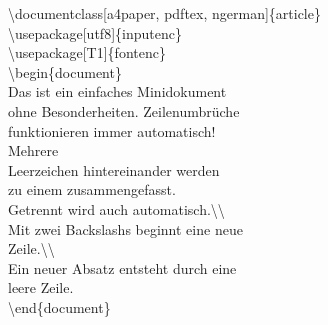 \color{nounibaredI}\color{nounibaredI}\textbackslash documentclass\color{black}\color{nounibagreenI}[a4paper, pdftex, ngerman]\color{black}\{article\} \\
\color{nounibaredI}\color{nounibaredI}\textbackslash usepackage\color{black}\color{nounibagreenI}[utf8]\color{black}\{inputenc\} \\
\color{nounibaredI}\color{nounibaredI}\textbackslash usepackage\color{black}\color{nounibagreenI}[T1]\color{black}\{fontenc\} \\
\color{nounibaredI}\color{unibablueI}\textbackslash\color{unibablueI}begin\color{black}\color{black}\{document\} \\
Das ist ein einfaches Minidokument \\
ohne Besonderheiten. Zeilenumbrüche \\
funktionieren immer automatisch! \\
Mehrere \\
Leerzeichen hintereinander werden  \\
zu einem zusammengefasst. \\
Getrennt wird auch automatisch.\color{nounibaredI}\color{nounibaredI}\textbackslash \color{nounibaredI}\textbackslash \color{black} \\
Mit zwei Backslashs beginnt eine neue \\
Zeile.\color{nounibaredI}\color{nounibaredI}\textbackslash \color{nounibaredI}\textbackslash \color{black} \\
Ein neuer Absatz entsteht durch eine \\
leere Zeile. \\
\color{nounibaredI}\color{unibablueI}\textbackslash\color{unibablueI}end\color{black}\color{black}\{document\} \\
